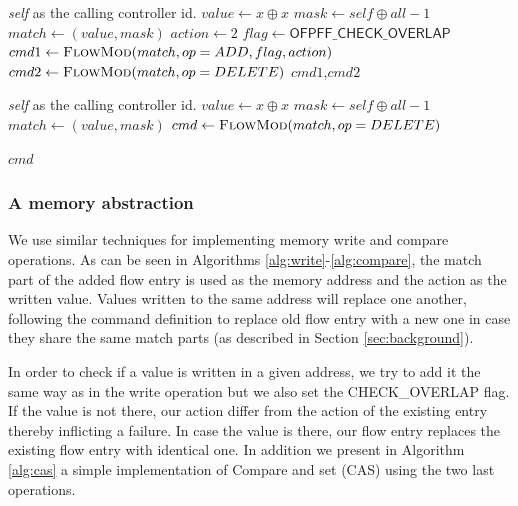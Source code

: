 \documentclass[conference]{sigcomm-alternate}
\newcommand{\concat}[0]{\oplus}
\newcommand{\claimcheck}{check\xspace}
\newcommand{\compare}{compare\xspace}
\newcommand{\memwrite}{write\xspace}
\begin{document}
\begin{algorithm}[H]
    \caption{$\textit{\claimcheck}(x)$}
    \label{alg:check}
    \begin{algorithmic}[1]
    \Require \emph{self} as the calling controller id.
    		\State $value \gets x\concat x$
    		\State $mask \gets self\concat all-1$
    		\State $match \gets (value,mask)$
    		\State $action \gets 2$
    		\State $flag \gets \textsf{OFPFF\_CHECK\_OVERLAP}$
    		\State $cmd1\gets \textsc{FlowMod}(match, op = ADD, flag, action) $
    		\State $cmd2\gets \textsc{FlowMod}(match, op = DELETE) $
			\Return $cmd1$,$cmd2$
    \end{algorithmic}
\end{algorithm}

\begin{algorithm}[H]
    \caption{$\textit{unclaim}(x)$}
    \label{alg:unclaim}
    \begin{algorithmic}[1]
    \Require \emph{self} as the calling controller id.
    		\State $value \gets x\concat x$
    		\State $mask \gets self\concat all-1$
    		\State $match \gets (value,mask)$
    		\State $cmd\gets \textsc{FlowMod}(match, op=DELETE) $
    	
			
			\Return $cmd$
    \end{algorithmic}
\end{algorithm}

\subsubsection{A memory abstraction}


We use similar techniques for implementing memory \memwrite and \compare
 operations.
 As can be seen in Algorithms \ref{alg:write}-\ref{alg:compare},
  the match part of the added flow entry is used as the memory address and the action as the written value. Values written to the same address will replace one another, following the command definition to replace old flow entry with a new one in case they share the same match parts (as described in Section \ref{sec:background}).

In order to check if a value is written in a given address, we try to add it the same way as in the \memwrite operation  but we also set the \textsf{CHECK\_OVERLAP} flag. If the value is not there, our action differ from the action of the existing entry thereby inflicting a failure.
In case the value is there, our flow entry replaces the existing flow entry with identical one.
In addition we present in Algorithm \ref{alg:cas} a simple implementation of Compare and set (CAS) using the two last operations.
\end{document}
